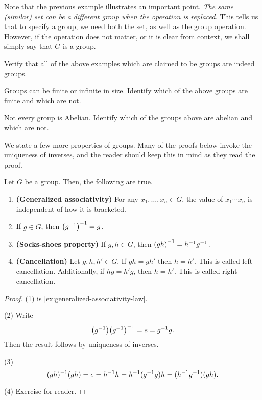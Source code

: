 \documentclass[./main.tex]{subfiles}
\begin{document}
Note that the previous example illustrates an important point. \emph{The same
(similar) set can be a different group when the operation is replaced.} This
tells us that to specify a group, we need both the set, as well as the group
operation. However, if the operation does not matter, or it is clear from
context, we shall simply say that $G$ is a group.

\begin{exercise}
    Verify that all of the above examples which are claimed to be groups are
    indeed groups. 
\end{exercise}

\begin{exercise}
    Groups can be finite or infinite in size. Identify which of the above groups
    are finite and which are not.
\end{exercise}

\begin{exercise}
    Not every group is Abelian. Identify which of the groups above are abelian
    and which are not.
\end{exercise}

We state a few more properties of groups. Many of the proofs below invoke the
uniqueness of inverses, and the reader should keep this in mind as they read the
proof.
\newpage
\begin{theorem}
\label{thm:more-group-properties}
    Let $G$ be a group. Then, the following are true.
    \begin{enumerate}
        \item \textbf{(Generalized associativity)} For any $x_1, \dots, x_n \in
        G$, the value of $x_1 \cdots x_n$ is independent of how it is bracketed. 
        \item If $g \in G$, then $\paren{g\inv}\inv = g$.
        \item \textbf{(Socks-shoes property)} If $g, h \in G$, then
        $\paren{gh}\inv = h \inv g \inv$.
        \item \textbf{(Cancellation)} Let $g, h, h' \in G$. If $gh = gh'$ then
        $h = h'$. This is called left cancellation. Additionally, if $hg = h'g$,
        then $h = h'$. This is called right cancellation.
    \end{enumerate}
\end{theorem}
\begin{proof}
    (1) is \cref{ex:generalized-associativity-law}. 

    (2)
    Write
    \[
        \paren{g\inv} \paren{g\inv}\inv = e = g\inv g. 
    \]
    Then the result follows by uniqueness of inverses.

    (3)
    \[
        (gh)^{-1} (gh) = e = h^{-1} h = h ^{-1} (g^{-1} g) h = (h^{-1} g^{-1}) (gh).
    \]

    (4) Exercise for reader.
\end{proof}
\end{document}
